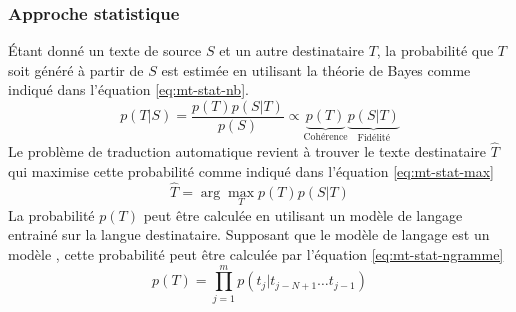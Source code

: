 \documentclass{KodeBook}
\begin{document}
\subsubsection{Approche statistique}

Étant donné un texte de source $S$ et un autre destinataire $T$, la probabilité que $T$ soit généré à partir de $S$ est estimée en utilisant la théorie de Bayes comme indiqué dans l'équation \ref{eq:mt-stat-nb}.
\begin{equation}\label{eq:mt-stat-nb} 
p(T|S) = \frac{p(T) p(S|T)}{p(S)} \propto \underbrace{p(T)}_\text{Cohérence} \underbrace{p(S|T)}_\text{Fidélité}
\end{equation}
Le problème de traduction automatique revient à trouver le texte destinataire $\hat{T}$ qui maximise cette probabilité comme indiqué dans l'équation \ref{eq:mt-stat-max}
\begin{equation}\label{eq:mt-stat-max} 
\hat{T} = \arg\max_{T} p(T) p(S|T)
\end{equation}
La probabilité $p(T)$ peut être calculée en utilisant un modèle de langage entrainé sur la langue destinataire. 
Supposant que le modèle de langage est un modèle , cette probabilité peut être calculée par l'équation \ref{eq:mt-stat-ngramme}
\begin{equation}\label{eq:mt-stat-ngramme} 
p(T) = \prod_{j=1}^m p(t_j|t_{j-N+1}\ldots t_{j-1})
\end{equation}
\end{document}
